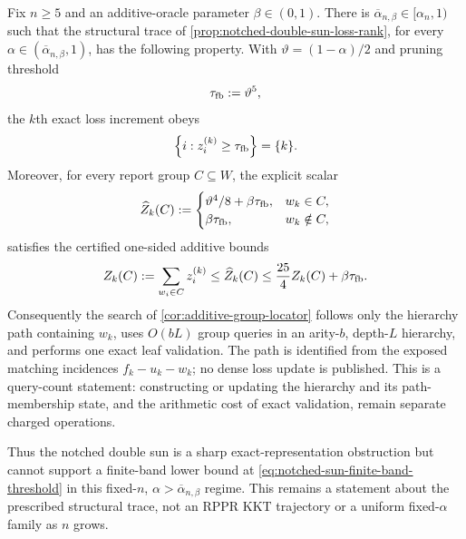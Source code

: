 \begin{corollary}
\label{cor:notched-sun-finite-band-separation}
Fix $n\geq5$ and an additive-oracle parameter $\beta\in(0,1)$.  There is
$\overline\alpha_{n,\beta}\in[\alpha_n,1)$ such that the structural trace of
\cref{prop:notched-double-sun-loss-rank}, for every
$\alpha\in(\overline\alpha_{n,\beta},1)$, has the following property.  With
$\vartheta=(1-\alpha)/2$ and pruning threshold
\begin{equation}
 \tau_{\rm fb}:=\vartheta^5,
 \label{eq:notched-sun-finite-band-threshold}
\end{equation}
the $k$th exact loss increment obeys
\begin{equation}
 \left\{i:z_i^{(k)}\geq\tau_{\rm fb}\right\}=\{k\}.
 \label{eq:notched-sun-single-heavy-loss}
\end{equation}
Moreover, for every report group $C\subseteq W$, the explicit scalar
\begin{equation}
 \widehat Z_k(C)
 :=\begin{cases}
    \vartheta^4/8+\beta\tau_{\rm fb},&w_k\in C,\\
    \beta\tau_{\rm fb},&w_k\notin C,
   \end{cases}
 \label{eq:notched-sun-separated-oracle}
\end{equation}
satisfies the certified one-sided additive bounds
\begin{equation}
 Z_k(C):=\sum_{w_i\in C}z_i^{(k)}
 \leq\widehat Z_k(C)
 \leq\frac{25}{4}Z_k(C)+\beta\tau_{\rm fb}.
 \label{eq:notched-sun-separated-oracle-bound}
\end{equation}
Consequently the search of
\cref{cor:additive-group-locator} follows only the hierarchy path containing
$w_k$, uses $O(bL)$ group queries in an arity-$b$, depth-$L$ hierarchy, and
performs one exact leaf validation.  The path is identified from the exposed
matching incidences $f_k-u_k-w_k$; no dense loss update is published.
This is a query-count statement: constructing or updating the hierarchy and
its path-membership state, and the arithmetic cost of exact validation, remain
separate charged operations.

Thus the notched double sun is a sharp exact-representation obstruction but
cannot support a finite-band lower bound at
\cref{eq:notched-sun-finite-band-threshold} in this fixed-$n$,
$\alpha>\overline\alpha_{n,\beta}$ regime.  This remains a statement about the
prescribed structural trace, not an RPPR KKT trajectory or a uniform
fixed-$\alpha$ family as $n$ grows.
\end{corollary}

